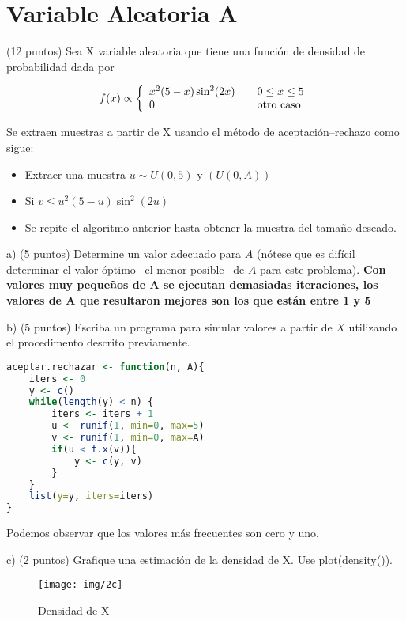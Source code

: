\documentclass[11pt]{article}
\begin{document}
\section{Variable Aleatoria A}
(12 puntos) Sea X variable aleatoria que tiene una función de densidad de probabilidad dada por

\[ f(x) \propto \left\{
  \begin{array}{l l}
    x^2(5-x)\sin^2(2x) & \quad 0 \leq x \leq 5\\
    0 & \quad \text{otro caso}
  \end{array} \right.\]

Se extraen muestras a partir de X usando el método de aceptación–rechazo como sigue:

\begin{itemize}
\item Extraer una muestra \( u \sim	U(0,5) \) y \( (U(0,A)) \)
\item Si \( v \leq u^2(5-u)\sin^2(2u)\)
\item Se repite el algoritmo anterior hasta obtener la muestra del tamaño deseado.
\end{itemize}


\noindent a) (5 puntos) Determine un valor adecuado para $A$ (nótese que es difícil determinar el valor óptimo –el menor posible– de $A$ para este problema).
\noindent \textbf{ Con valores muy pequeños de A se ejecutan demasiadas iteraciones, los valores de A que resultaron mejores son los que están entre 1 y 5 }

\noindent b) (5 puntos) Escriba un programa para simular valores a partir de $X$ utilizando el procedimento descrito previamente.

\begin{lstlisting}[language=R]
aceptar.rechazar <- function(n, A){
    iters <- 0
    y <- c()
    while(length(y) < n) {
        iters <- iters + 1
        u <- runif(1, min=0, max=5)
        v <- runif(1, min=0, max=A)
        if(u < f.x(v)){
            y <- c(y, v)
        }
    }
    list(y=y, iters=iters)
}
\end{lstlisting}

Podemos observar que los valores más frecuentes son cero y uno.

\noindent c) (2 puntos) Grafique una estimación de la densidad de X. Use plot(density()).

\begin{figure} [H]
	\texttt{[image: img/2c]}
	\caption[]{Densidad de X}
\label{fig:fig1}
\end{figure}
\end{document}
